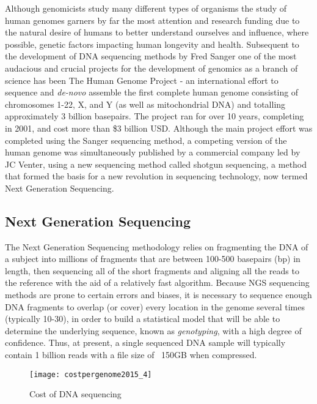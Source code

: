 Although genomicists study many different types of organisms the study of human genomes garners by far the most attention and research funding\autocite{needcitation} due to the natural desire of humans to better understand ourselves and influence, where possible, genetic factors impacting human longevity and health. Subsequent to the development of DNA sequencing methods by Fred Sanger one of the most audacious and crucial projects for the development of genomics as a branch of science has been The Human Genome Project\autocite{lander2001initial} - an international effort to sequence and \emph{de-novo} assemble the first complete human genome consisting of chromosomes 1-22, X, and Y (as well as mitochondrial DNA) and totalling approximately 3 billion basepairs. The project ran for over 10 years, completing in 2001, and cost more than \$3 billion USD. Although the main project effort was completed using the Sanger sequencing method, a competing version of the human genome was simultaneously published by a commercial company led by JC Venter\autocite{venter2001sequence}, using a new sequencing method called shotgun sequencing\autocite{venter1998shotgun}, a method that formed the basis for a new revolution in sequencing technology, now termed Next Generation Sequencing\autocite{schuster2007next}.

\subsection{Next Generation Sequencing}
The Next Generation Sequencing methodology\autocite{mardis2008next} relies on fragmenting the DNA of a subject into millions of fragments that are between 100-500 basepairs (bp) in length, then sequencing all of the short fragments and aligning all the reads to the reference with the aid of a relatively fast algorithm\autocite{li2010survey}. Because NGS sequencing methods are prone to certain errors and biases\autocite{dohm2008substantial}, it is necessary to sequence enough DNA fragments to overlap (or cover) every location in the genome several times (typically 10-30), in order to build a statistical model that will be able to determine the underlying sequence, known as \emph{genotyping}\autocite{nielsen2011genotype}, with a high degree of confidence. Thus, at present, a single sequenced DNA sample will typically contain 1 billion reads with a file size of ~150GB when compressed.

\begin{figure}[H]
\texttt{[image: costpergenome2015\_4]}
\centering
\caption {Cost of DNA sequencing\autocite{The_Cost_of_Sequencing_a_Human_Genome_2016-11-04}}
\label{fig:costpergenome2015_4}
\end{figure}

